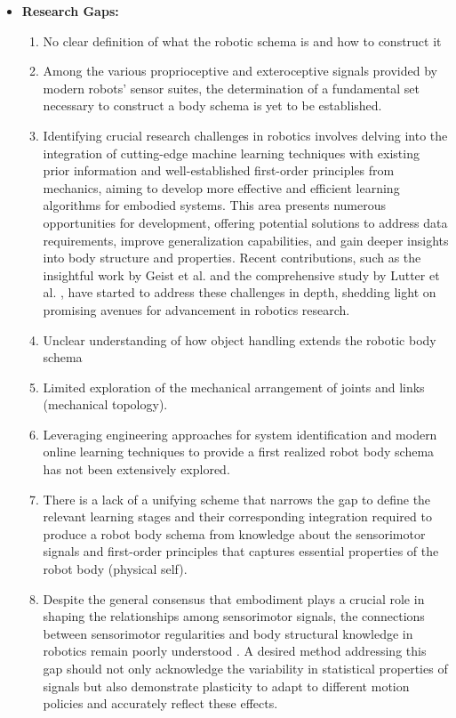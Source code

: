 \documentclass[12pt, a4paper]{article}
\begin{document}
\begin{itemize}
	\item \textbf{Research Gaps:}
	\begin{enumerate}
		\item No clear definition of what the robotic schema is and how to construct it
		\item Among the various proprioceptive and exteroceptive signals provided by modern robots' sensor suites, the determination of a fundamental set necessary to construct a body schema is yet to be established.				
		\item Identifying crucial research challenges in robotics involves delving into the integration of cutting-edge machine learning techniques with existing prior information and well-established first-order principles from mechanics, aiming to develop more effective and efficient learning algorithms for embodied systems. This area presents numerous opportunities for development, offering potential solutions to address data requirements, improve generalization capabilities, and gain deeper insights into body structure and properties. Recent contributions, such as the insightful work by Geist et al. \cite{Geist2021Structuredlearningrigid} and the comprehensive study by Lutter et al. \cite{Lutter2023Combiningphysicsdeep}, have started to address these challenges in depth, shedding light on promising avenues for advancement in robotics research.
		\item Unclear understanding of how object handling extends the robotic body schema
		\item Limited exploration of the mechanical arrangement of joints and links (mechanical topology).
		\item Leveraging engineering approaches for system identification and modern online learning techniques to provide a first realized robot body schema has not been extensively explored.
		\item There is a lack of a unifying scheme that narrows the gap to define the relevant learning stages and their corresponding integration required to produce a robot body schema from  knowledge about the sensorimotor signals and first-order principles that captures essential properties of the robot body (physical self).
		\item Despite the general consensus that embodiment plays a crucial role in shaping the relationships among sensorimotor signals, the connections between sensorimotor regularities and body structural knowledge in robotics remain poorly understood \cite{Jacquey2019Sensorimotorcontingenciesas}. A desired method addressing this gap should not only acknowledge the variability in statistical properties of signals but also demonstrate plasticity to adapt to different motion policies and accurately reflect these effects.
	\end{enumerate}
\end{itemize}
\end{document}
